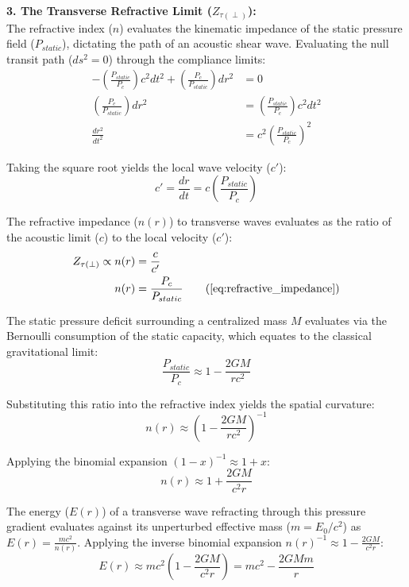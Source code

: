 \textbf{3. The Transverse Refractive Limit ($Z_{\tau(\perp)}$):} \\
The refractive index ($n$) evaluates the kinematic impedance of the static pressure field ($P_{static}$), dictating the path of an acoustic shear wave. Evaluating the null transit path ($ds^2 = 0$) through the compliance limits:
\begin{align}
    -\left(\frac{P_{static}}{P_c}\right) c^2 dt^2 + \left(\frac{P_c}{P_{static}}\right) dr^2 &= 0 \\
    \left(\frac{P_c}{P_{static}}\right) dr^2 &= \left(\frac{P_{static}}{P_c}\right) c^2 dt^2 \\
    \frac{dr^2}{dt^2} &= c^2 \left(\frac{P_{static}}{P_c}\right)^2 
\end{align}

Taking the square root yields the local wave velocity ($c'$):
\begin{equation}
    c' = \frac{dr}{dt} = c \left(\frac{P_{static}}{P_c}\right) 
\end{equation}

The refractive impedance ($n(r)$) to transverse waves evaluates as the ratio of the acoustic limit ($c$) to the local velocity ($c'$):
\begin{align}
    Z_{\tau(\perp)} \propto n(r) &= \frac{c}{c'} \\ %
    n(r) &= \frac{P_c}{P_{static}} \tag{\ref{eq:refractive_impedance}}
\end{align}

The static pressure deficit surrounding a centralized mass $M$ evaluates via the Bernoulli consumption of the static capacity, which equates to the classical gravitational limit: 
\begin{equation}
    \frac{P_{static}}{P_c} \approx 1 - \frac{2GM}{rc^2}
\end{equation}

Substituting this ratio into the refractive index yields the spatial curvature:
\begin{equation}
    n(r) \approx \left( 1 - \frac{2GM}{rc^2} \right)^{-1} 
\end{equation}

Applying the binomial expansion $(1-x)^{-1} \approx 1+x$:
\begin{equation}
    n(r) \approx 1 + \frac{2GM}{c^2 r} 
\end{equation}


The energy ($E(r)$) of a transverse wave refracting through this pressure gradient evaluates against its unperturbed effective mass ($m = E_0/c^2$) as $E(r) = \frac{mc^2}{n(r)}$. Applying the inverse binomial expansion $n(r)^{-1} \approx 1 - \frac{2GM}{c^2 r}$:
\begin{equation}
    E(r) \approx mc^2 \left( 1 - \frac{2GM}{c^2 r} \right) = mc^2 - \frac{2GMm}{r} 
\end{equation}

